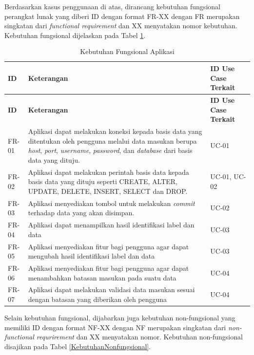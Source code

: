 	Berdasarkan kasus penggunaan di atas, dirancang kebutuhan fungsional perangkat lunak yang diberi ID dengan format FR-XX dengan FR merupakan singkatan dari \textit{functional requirement} dan XX menyatakan nomor kebutuhan. Kebutuhan fungsional dijelaskan pada Tabel \ref{KebutuhanFungsional}.

	\begin{longtable}{ | p{2cm} | p{6cm} | p{4cm} | }
	    \caption{Kebutuhan Fungsional Aplikasi}
	    \label{KebutuhanFungsional}\\ \hline
	    \centering\bfseries{ID} & \centering\bfseries{Keterangan} & \centering\bfseries{ID Use Case Terkait} \tabularnewline \hline
	    \endfirsthead
	    \hline
	    \centering\bfseries{ID} & \centering\bfseries{Keterangan} & \centering\bfseries{ID Use Case Terkait} \tabularnewline \hline
	    \endhead
	    FR-01 & Aplikasi dapat melakukan koneksi kepada basis data yang ditentukan oleh pengguna melalui data masukan berupa \textit{host}, \textit{port}, \textit{username}, \textit{password}, dan \textit{database} dari basis data yang dituju. & UC-01 \\ \hline
	    FR-02 & Aplikasi dapat melakukan perintah basis data kepada basis data yang dituju seperti CREATE, ALTER, UPDATE, DELETE, INSERT, SELECT dan DROP. & UC-01, UC-02 \\ \hline
	    FR-03 & Aplikasi menyediakan tombol untuk melakukan \textit{commit} terhadap data yang akan disimpan. & UC-02 \\ \hline
	    FR-04 & Aplikasi dapat menampilkan hasil identifikasi label dan data & UC-03 \\ \hline
	    FR-05 & Aplikasi menyediakan fitur bagi pengguna agar dapat mengubah hasil identifikasi label dan data & UC-03 \\ \hline
	    FR-06 & Aplikasi menyediakan fitur bagi pengguna agar dapat menambahkan batasan masukan pada suatu data & UC-04 \\ \hline
	    FR-07 & Aplikasi dapat melakukan validasi data masukan sesuai dengan batasan yang diberikan oleh pengguna & UC-04 \\ \hline
	\end{longtable}

	Selain kebutuhan fungsional, dijabarkan juga kebutuhan non-fungsional yang memiliki ID dengan format NF-XX dengan NF merupakan singkatan dari \textit{non-functional requrirement} dan XX menyatakan nomor. Kebutuhan non-fungsional disajikan pada Tabel \ref{KebutuhanNonfungsional}.

